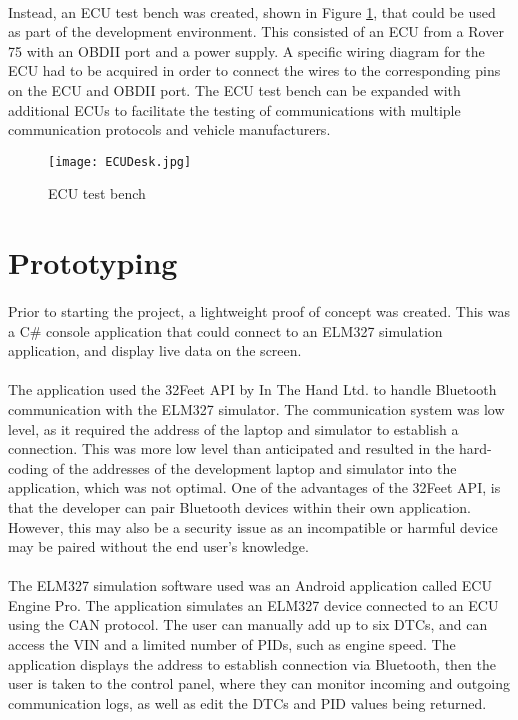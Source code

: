 {	\paragraph{}{
	Instead, an ECU test bench was created, shown in Figure \ref{fig:TestBench}, that could be used as part of the development environment. This consisted of an ECU from a Rover 75 with an OBDII port and a power supply. A specific wiring diagram for the ECU had to be acquired in order to connect the wires to the corresponding pins on the ECU and OBDII port. The ECU test bench can be expanded with additional ECUs to facilitate the testing of communications with multiple communication protocols and vehicle manufacturers.
	}	
	
	\begin{figure}[h]
		\begin{center}										
				\texttt{[image: ECUDesk.jpg]}
				\caption{ECU test bench}
				\label{fig:TestBench}
		\end{center}
	\end{figure}
}
\label{sec:DeveEnv}

\section{Prototyping}
	\paragraph{}{
	Prior to starting the project, a lightweight proof of concept was created. This was a C{\#} console application that could connect to an ELM327 simulation application, and display live data on the screen. 
	}
	\paragraph{}{ %
	The application used the 32Feet API by In The Hand Ltd. to handle Bluetooth communication with the ELM327 simulator. The communication system was low level, as it required the address of the laptop and simulator to establish a connection. This was more low level than anticipated and resulted in the hard-coding of the addresses of the development laptop and simulator into the application, which was not optimal. One of the advantages of the 32Feet API, is that the developer can pair Bluetooth devices within their own application. However, this may also be a security issue as an incompatible or harmful device may be paired without the end user's knowledge.
	}
	\paragraph{}{
	The ELM327 simulation software used was an Android application called ECU Engine Pro. The application simulates an ELM327 device connected to an ECU using the CAN protocol. The user can manually add up to six DTCs, and can access the VIN and a limited number of PIDs, such as engine speed. The application displays the address to establish connection via Bluetooth, then the user is taken to the control panel, where they can monitor incoming and outgoing communication logs, as well as edit the DTCs and PID values being returned.
	}
